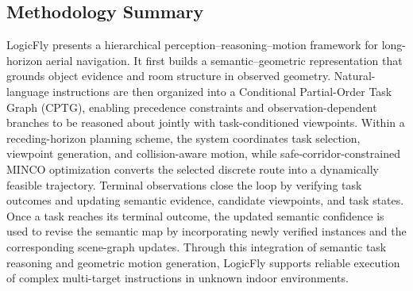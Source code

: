 \documentclass[letterpaper,10pt,journal]{IEEEtran}
\begin{document}
\subsection{Methodology Summary}

LogicFly presents a hierarchical perception--reasoning--motion framework for long-horizon aerial navigation. It first builds a semantic--geometric representation that grounds object evidence and room structure in observed geometry. Natural-language instructions are then organized into a Conditional Partial-Order Task Graph (CPTG), enabling precedence constraints and observation-dependent branches to be reasoned about jointly with task-conditioned viewpoints. Within a receding-horizon planning scheme, the system coordinates task selection, viewpoint generation, and collision-aware motion, while safe-corridor-constrained MINCO optimization converts the selected discrete route into a dynamically feasible trajectory. Terminal observations close the loop by verifying task outcomes and updating semantic evidence, candidate viewpoints, and task states. Once a task reaches its terminal outcome, the updated semantic confidence is used to revise the semantic map by incorporating newly verified instances and the corresponding scene-graph updates. Through this integration of semantic task reasoning and geometric motion generation, LogicFly supports reliable execution of complex multi-target instructions in unknown indoor environments.
\end{document}
